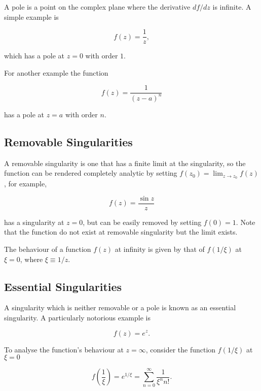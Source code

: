 \documentclass[english,a4paper,12pt]{report}
\begin{document}
A pole is a point on the complex plane where the derivative \(df /dz\) is infinite. A simple example is

\begin{equation}
    f(z) = \frac{1}{z}, 
\end{equation}

which has a pole at \(z = 0\) with order \(1\).

For another example the function

\begin{equation}
    f(z) = \frac{1}{(z-a)^{n} }
\end{equation}

has a pole at \(z = a\) with order \(n\). 

\subsection{Removable Singularities}

A removable singularity is one that has a finite limit at the singularity, so the function can be rendered completely analytic by setting \(f(z_0 ) = \lim_{z \to z_0 } f(z) \), for example,

\begin{equation}
    f(z) = \frac{\sin z}{z} 
\end{equation}

has a singularity at \(z = 0\), but can be easily removed by setting \(f(0) = 1\). Note that the function do not exist at removable singularity but the limit exists.

The behaviour of a function \(f(z)\) at infinity is given by that of \(f(1 /\xi )\) at \(\xi =0\), where \(\xi \equiv 1 /z\).   

\subsection{Essential Singularities}

A singularity which is neither removable or a pole is known as an essential singularity. A particularly notorious example is 

\begin{equation}
    f(z) = e^z.
\end{equation}

To analyse the function's behaviour at \(z = \infty\), consider the function \(f(1/\xi )\) at \(\xi =0\)

\begin{equation}
    f\left( \frac{1}{\xi }  \right) = e^{1/\xi } = \sum_{n=0}^{\infty} \frac{1}{\xi ^{n} n! }.  
\end{equation}
\end{document}
